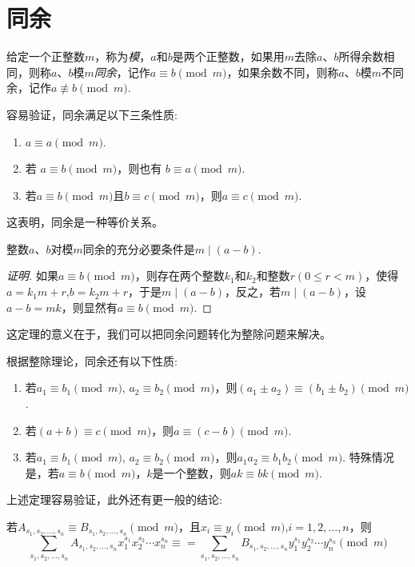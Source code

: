
\section{同余}
\label{sec:congruences}

\begin{definition}
  给定一个正整数$m$，称为\emph{模}，$a$和$b$是两个正整数，如果用$m$去除$a$、$b$所得余数相同，则称$a$、$b$模$m$\emph{同余}，记作$a \equiv b \pmod{m}$，如果余数不同，则称$a$、$b$模$m$不同余，记作$a \not \equiv b \pmod{m}$.
\end{definition}

容易验证，同余满足以下三条性质:
\begin{enumerate}
\item $a \equiv a \pmod{m}$.
\item 若 $a \equiv b \pmod{m}$，则也有 $b \equiv a \pmod{m}$.
\item 若$a \equiv b \pmod{m}$且$b \equiv c \pmod{m}$，则$a \equiv c \pmod{m}$.
\end{enumerate}
这表明，同余是一种等价关系。

\begin{theorem}
  整数$a$、$b$对模$m$同余的充分必要条件是$m \mid (a-b)$.
\end{theorem}

\begin{proof}[证明]
  如果$a \equiv b \pmod{m}$，则存在两个整数$k_1$和$k_2$和整数$r(0 \leqslant r < m)$，使得$a=k_1m+r$,$b=k_2m+r$，于是$m \mid (a-b)$，反之，若$m \mid (a-b)$，设$a-b=mk$，则显然有$a \equiv b \pmod{m}$.
\end{proof}

这定理的意义在于，我们可以把同余问题转化为整除问题来解决。

\begin{theorem}
根据整除理论，同余还有以下性质:
\begin{enumerate}
\item 若$a_1 \equiv b_1 \pmod{m}$, $a_2 \equiv b_2 \pmod{m}$，则$(a_1\pm a_2) \equiv (b_1 \pm b_2) \pmod{m}$.
\item 若$(a+b) \equiv c \pmod{m}$，则$a \equiv (c-b) \pmod{m}$.
\item 若$a_1 \equiv b_1 \pmod{m}$, $a_2 \equiv b_2 \pmod{m}$，则$a_1a_2 \equiv b_1b_2 \pmod{m}$. 特殊情况是，若$a \equiv b \pmod{m}$，$k$是一个整数，则$ak \equiv bk \pmod{m}$.
\end{enumerate}
\end{theorem}

上述定理容易验证，此外还有更一般的结论:
\begin{theorem}
  若$A_{s_1,s_2,\ldots,s_n} \equiv B_{s_1,s_2,\ldots,s_n} \pmod{m}$，且$x_i \equiv y_i \pmod{m}$,$i=1,2,\ldots,n$，则
  \[ \sum_{s_1,s_2,\ldots,s_n} A_{s_1,s_2,\ldots,s_n} x_1^{s_1}x_2^{s_2} \cdots x_n^{s_n} \equiv =  \sum_{s_1,s_2,\ldots,s_n} B_{s_1,s_2,\ldots,s_n} y_1^{s_1}y_2^{s_2} \cdots y_n^{s_n} \pmod{m} \]
\end{theorem}

